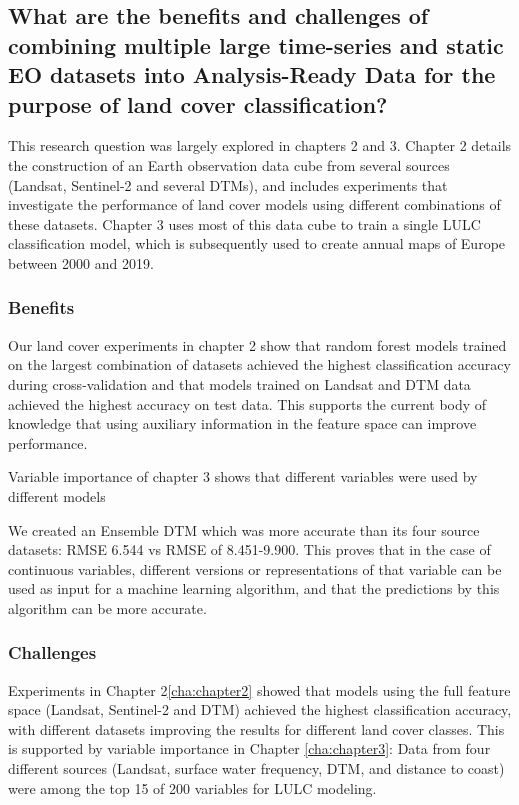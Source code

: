     \subsection{What are the benefits and challenges of combining multiple large time-series and static EO datasets into Analysis-Ready Data for the purpose of land cover classification?}
    \label{syn:rq1}

        This research question was largely explored in chapters 2 and 3. Chapter 2 details the construction of an Earth observation data cube from several sources (Landsat, Sentinel-2 and several DTMs), and includes experiments that investigate the performance of land cover models using different combinations of these datasets. Chapter 3 uses most of this data cube to train a single LULC classification model, which is subsequently used to create annual maps of Europe between 2000 and 2019. 

        \subsubsection{Benefits}
    
            Our land cover experiments in chapter 2 show that random forest models trained on the largest combination of datasets achieved the highest classification accuracy during cross-validation and that models trained on Landsat and DTM data achieved the highest accuracy on test data.
            This supports the current body of knowledge that using auxiliary information in the feature space can improve performance.
            
            Variable importance of chapter 3 shows that different variables were used by different models
    
            We created an Ensemble DTM which was more accurate than its four source datasets: RMSE 6.544 vs RMSE of 8.451-9.900. This proves that in the case of continuous variables, different versions or representations of that variable can be used as input for a machine learning algorithm, and that the predictions by this algorithm can be more accurate.

        \subsubsection{Challenges}
            
            Experiments in Chapter 2\ref{cha:chapter2} showed that models using the full feature space (Landsat, Sentinel-2 and DTM) achieved the highest classification accuracy, with different datasets improving the results for different land cover classes. This is supported by variable importance in Chapter \ref{cha:chapter3}: Data from four different sources (Landsat, surface water frequency, DTM, and distance to coast) were among the top 15 of 200 variables for LULC modeling.
            
